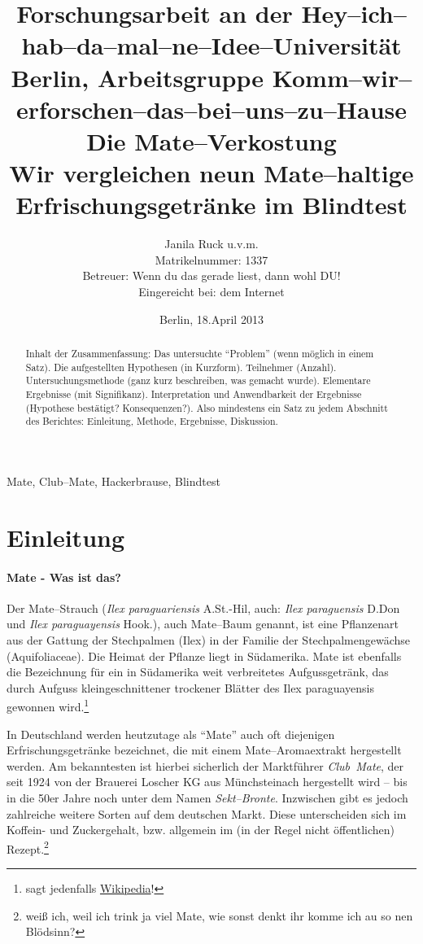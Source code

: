 \documentclass[11pt,a4paper,ngerman]{article}
\title{
{\normalsize Forschungsarbeit an der Hey--ich--hab--da--mal--ne--Idee--Universität\\
Berlin, Arbeitsgruppe Komm--wir--erforschen--das--bei--uns--zu--Hause}\\[6ex] 
\textbf{Die Mate--Verkostung}\\
\normalsize{Wir vergleichen neun Mate--haltige Erfrischungsgetränke im Blindtest}}
\author{Janila Ruck u.v.m.\\
{\normalsize Matrikelnummer: 1337}\\
{\normalsize Betreuer: Wenn du das gerade liest, dann wohl DU!}\\
{\normalsize Eingereicht bei: dem Internet}}
\date{Berlin, 18.April 2013}
\begin{document}
\begin{titlepage}
\maketitle
\thispagestyle{empty}

\vfill{}

\begin{abstract}%
Inhalt der Zusammenfassung: 
Das untersuchte "`Problem"' (wenn möglich in einem Satz). 
Die aufgestellten Hypothesen (in Kurzform). 
Teilnehmer (Anzahl). 
Untersuchungsmethode (ganz kurz beschreiben, was gemacht wurde).
Elementare Ergebnisse (mit Signifikanz). 
Interpretation und Anwendbarkeit der Ergebnisse (Hypothese bestätigt? Konsequenzen?). 
Also mindestens ein Satz zu jedem Abschnitt des Berichtes: Einleitung, Methode, Ergebnisse, Diskussion.
\end{abstract}
\begin{keywords}Mate, Club--Mate, Hackerbrause, Blindtest \end{keywords}
\end{titlepage}

\pagestyle{empty}
\clearpage{}


\tableofcontents

\clearpage{}
\pagestyle{fancy}
\setcounter{page}{1}
 


\section{Einleitung}\label{sec:einleitung}
\paragraph{Mate - Was ist das?}
Der Mate--Strauch (\textit{Ilex paraguariensis} A.St.-Hil, auch: \textit{Ilex paraguensis}  D.Don und \textit{Ilex paraguayensis} Hook.), auch Mate--Baum genannt, ist eine Pflanzenart aus der Gattung der Stechpalmen (Ilex) in der Familie der Stechpalmengewächse (Aquifoliaceae). Die Heimat der Pflanze liegt in Südamerika. Mate ist ebenfalls die Bezeichnung für ein in Südamerika weit verbreitetes Aufgussgetränk, das durch Aufguss kleingeschnittener trockener Blätter des Ilex paraguayensis gewonnen wird.\footnote{sagt jedenfalls \href{http://de.wikipedia.org/wiki/Mate}{Wikipedia}!}

In Deutschland werden heutzutage als "`Mate"' auch oft diejenigen Erfrischungsgetränke bezeichnet, die mit einem Mate--Aromaextrakt hergestellt werden. Am bekanntesten ist hierbei sicherlich der Marktführer \textit{Club~Mate}, der seit 1924 von der Brauerei Loscher KG aus Münchsteinach hergestellt wird -- bis in die 50er Jahre noch unter dem Namen \textit{Sekt--Bronte}. Inzwischen gibt es jedoch zahlreiche weitere Sorten auf dem deutschen Markt. Diese unterscheiden sich im Koffein- und Zuckergehalt, bzw. allgemein im (in der Regel nicht öffentlichen) Rezept.\footnote{weiß ich, weil ich trink ja viel Mate, wie sonst denkt ihr komme ich au so nen Blödsinn?}
\end{document}
